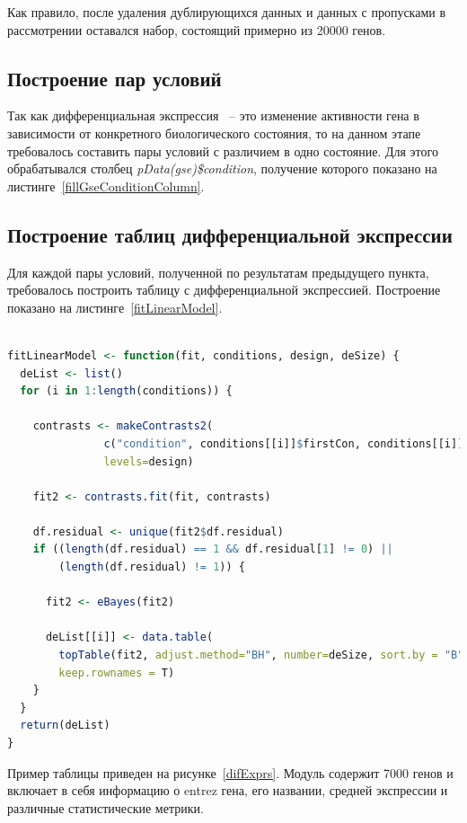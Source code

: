\documentclass[times,specification,annotation]{itmo-student-thesis}
\begin{document}
Как правило, после удаления дублирующихся данных и данных с пропусками в рассмотрении оставался набор, состоящий примерно из 20000 генов.

\subsection{Построение пар условий}

Так как дифференциальная экспрессия ~-- это изменение активности гена в зависимости от конкретного биологического состояния, то на данном этапе требовалось составить пары условий с различием в одно состояние. Для этого обрабатывался столбец \textit{pData(gse)\$condition}, получение которого показано на листинге~\ref{fillGseConditionColumn}.

\subsection{Построение таблиц дифференциальной экспрессии}

Для каждой пары условий, полученной по результатам предыдущего пункта, требовалось построить таблицу с дифференциальной экспрессией. Построение показано на листинге~\ref{fitLinearModel}.

\begin{lstlisting}[float=!h, caption={Построение модулей генов при помощи дифференциальной экспрессии.}, captionpos=b, label={fitLinearModel}, basicstyle=\footnotesize, language=R]

fitLinearModel <- function(fit, conditions, design, deSize) {
  deList <- list()
  for (i in 1:length(conditions)) {
    
    contrasts <- makeContrasts2(
               c("condition", conditions[[i]]$firstCon, conditions[[i]]$secondCon), 
               levels=design)
    
    fit2 <- contrasts.fit(fit, contrasts)
    
    df.residual <- unique(fit2$df.residual)
    if ((length(df.residual) == 1 && df.residual[1] != 0) ||
        (length(df.residual) != 1)) {
      
      fit2 <- eBayes(fit2)
      
      deList[[i]] <- data.table(
        topTable(fit2, adjust.method="BH", number=deSize, sort.by = "B"), 
        keep.rownames = T)
    }
  }
  return(deList)
}

\end{lstlisting} 

Пример таблицы приведен на рисунке~\ref{difExprs}. Модуль содержит 7000 генов и включает в себя информацию о entrez гена, его названии, средней экспрессии и различные статистические метрики. 
\end{document}
